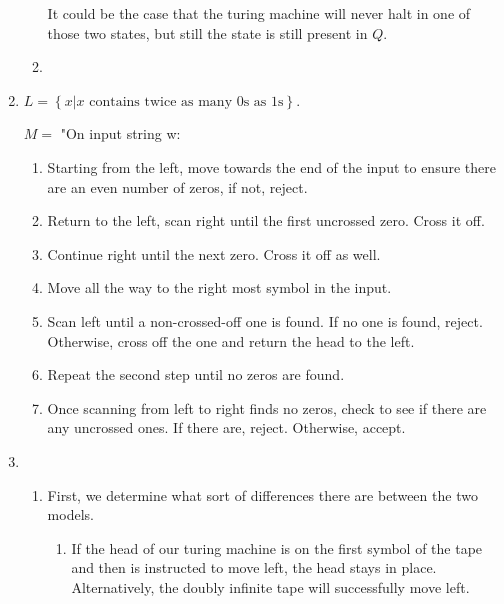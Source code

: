 \documentclass{article}
\newcommand{\set}[1]{{\left\{#1\right\}}}    %
\begin{document}
\begin{enumerate}
\begin{enumerate}
                It could be the case that the turing machine will never halt in one of those two states, but still the state is still present in $Q$.
            \item
        \end{enumerate}
    \item %
        $L = \set{x | x \text{ contains twice as many 0s as 1s}}$.

        $M = $ "On input string w:

        \begin{enumerate}
            \item
                Starting from the left, move towards the end of the input to ensure there are an even number of zeros, if not, reject.
            \item
                Return to the left, scan right until the first uncrossed zero. Cross it off.
            \item
                Continue right until the next zero. Cross it off as well.
            \item
                Move all the way to the right most symbol in the input.
            \item
                Scan left until a non-crossed-off one is found. If no one is found, reject.
                Otherwise, cross off the one and return the head to the left.
            \item
                Repeat the second step until no zeros are found.
            \item
                Once scanning from left to right finds no zeros, check to see if there are any uncrossed ones.
                If there are, reject. Otherwise, accept.
        \end{enumerate}
    \item %
        \begin{enumerate}
            \item
                First, we determine what sort of differences there are between the two models.

                \begin{enumerate}
                    \item
                        If the head of our turing machine is on the first symbol of the tape and then is instructed to move left, the head stays in place.
                        Alternatively, the doubly infinite tape will successfully move left.
                \end{enumerate}


\end{enumerate}
\end{enumerate}
\end{document}
